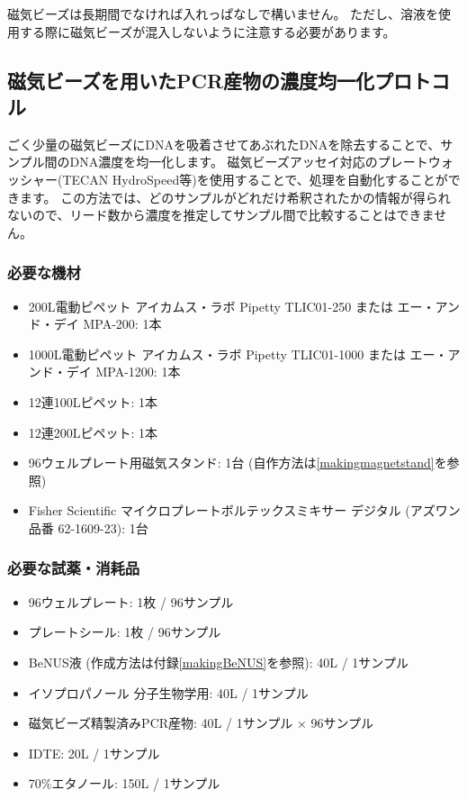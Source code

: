 \documentclass[titlepage,10pt,a4paper,uplatex]{jsbook}
\begin{document}
磁気ビーズは長期間でなければ入れっぱなしで構いません。
ただし、溶液を使用する際に磁気ビーズが混入しないように注意する必要があります。

\subsection{磁気ビーズを用いたPCR産物の濃度均一化プロトコル}

ごく少量の磁気ビーズにDNAを吸着させてあぶれたDNAを除去することで、サンプル間のDNA濃度を均一化します。
磁気ビーズアッセイ対応のプレートウォッシャー(TECAN HydroSpeed等)を使用することで、処理を自動化することができます。
この方法では、どのサンプルがどれだけ希釈されたかの情報が得られないので、リード数から濃度を推定してサンプル間で比較することはできません。

\subsubsection{必要な機材}
\begin{itemize}
\item 200{\textmu}L電動ピペット アイカムス・ラボ Pipetty TLIC01-250 または エー・アンド・デイ MPA-200: 1本
\item 1000{\textmu}L電動ピペット アイカムス・ラボ Pipetty TLIC01-1000 または エー・アンド・デイ MPA-1200: 1本
\item 12連100{\textmu}Lピペット: 1本
\item 12連200{\textmu}Lピペット: 1本
\item 96ウェルプレート用磁気スタンド: 1台 (自作方法は\ref{makingmagnetstand}を参照)
\item Fisher Scientific マイクロプレートボルテックスミキサー デジタル (アズワン品番 62-1609-23): 1台
\end{itemize}

\subsubsection{必要な試薬・消耗品}
\begin{itemize}
\item 96ウェルプレート: 1枚 / 96サンプル
\item プレートシール: 1枚 / 96サンプル
\item BeNUS液 (作成方法は付録\ref{makingBeNUS}を参照): 40{\textmu}L / 1サンプル
\item イソプロパノール 分子生物学用: 40{\textmu}L / 1サンプル
\item 磁気ビーズ精製済みPCR産物: 40{\textmu}L / 1サンプル × 96サンプル
\item IDTE: 20{\textmu}L / 1サンプル
\item 70\%エタノール: 150{\textmu}L / 1サンプル
\end{itemize}
\end{document}
